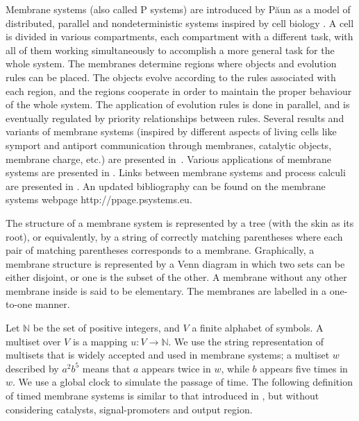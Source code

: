 \documentclass{eptcs}
\begin{document}
Membrane systems (also called P systems) are introduced by P\u aun as a
model of distributed, parallel and nondeterministic systems inspired by
cell biology \cite{Paun02}. A cell is divided in various compartments, each
compartment with a different task, with all of them working simultaneously
to accomplish a more general task for the whole system. The membranes
determine regions where objects and evolution rules can be placed. The
objects evolve according to the rules associated with each region, and the
regions cooperate in order to maintain the proper behaviour of the whole
system. The application of evolution rules is done in parallel, and is
eventually regulated by priority relationships between rules. Several
results and variants of membrane systems (inspired by different aspects of
living cells like symport and antiport communication through membranes,
catalytic objects, membrane charge, etc.) are presented in~\cite{Paun02}.
Various applications of membrane systems are presented in \cite{Ciobanu06}.
Links between membrane systems and process calculi are presented in
\cite{Ciobanu10}. An updated bibliography can be found on the membrane
systems webpage {\sf http://ppage.psystems.eu}.

The structure of a membrane system is represented by a tree (with the skin as
its root), or equivalently, by a string of correctly matching parentheses where
each pair of matching parentheses corresponds to a membrane. Graphically, a
membrane structure is represented by a Venn diagram in which two sets can be
either disjoint, or one is the subset of the other. A membrane without any other
membrane inside is said to be elementary. The membranes are labelled in a
one-to-one manner.

Let $\mathds{N}$ be the set of positive integers, and $V$ a finite alphabet of
symbols. A multiset over $V$ is a mapping $u: V \to \mathds{N}$. We use the
string representation of multisets that is widely accepted and used in membrane
systems; a multiset $w$ described by $a^2b^5$ means that $a$ appears twice in
$w$, while $b$ appears five times in $w$. We use a global clock to simulate the
passage of time. The following definition of timed membrane systems is similar
to that introduced in \cite{Cavaliere05}, but without considering catalysts,
signal-promoters and output region.
\end{document}
